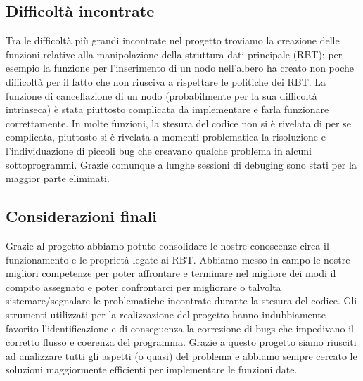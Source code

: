 \documentclass[paper=a4, fontsize=11pt,twoside]{scrartcl}   %
\begin{document}
			\subsection{Difficoltà incontrate}
				Tra le difficoltà più grandi incontrate nel progetto troviamo la creazione delle funzioni relative alla manipolazione della struttura dati principale (RBT); per esempio la funzione per l'inserimento di un nodo nell'albero ha creato non poche difficoltà per il fatto che non riusciva a rispettare le politiche dei RBT. La funzione di cancellazione di un nodo (probabilmente per la sua difficoltà intrinseca) è stata piuttosto complicata da implementare e farla funzionare correttamente. In molte funzioni, la stesura del codice non si è rivelata di per se complicata, piuttosto si è rivelata a momenti problematica la risoluzione e l’individuazione di piccoli bug che creavano qualche problema in alcuni sottoprogrammi. Grazie comunque a lunghe sessioni di debuging sono stati per la maggior parte eliminati.
				
			\subsection{Considerazioni finali}
				Grazie al progetto abbiamo potuto consolidare le nostre conoscenze circa il funzionamento e le proprietà legate ai RBT. Abbiamo messo in campo le nostre migliori competenze per poter affrontare e terminare nel migliore dei modi il compito assegnato e poter confrontarci per migliorare o talvolta sistemare/segnalare le problematiche incontrate durante la stesura del codice. Gli strumenti utilizzati per la realizzazione del progetto hanno indubbiamente favorito l'identificazione e di conseguenza la correzione di bugs che impedivano il corretto flusso e coerenza del programma. Grazie a questo progetto siamo riusciti ad analizzare tutti gli aspetti (o quasi) del problema e abbiamo sempre cercato le soluzioni maggiormente efficienti per implementare le funzioni date.					
		 
\end{document}
